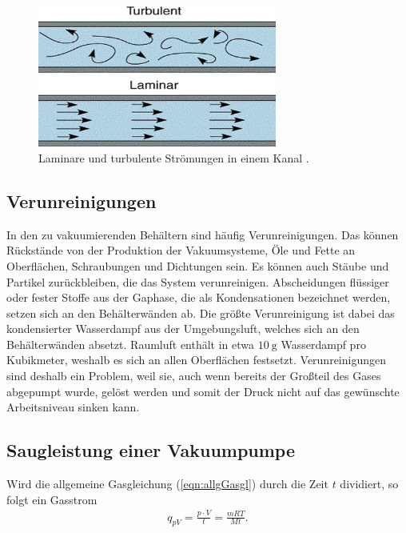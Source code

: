 \begin{figure}[H]
    \centering
    \includegraphics[width=0.7\textwidth]{data/LaminarTurbulent.jpeg}
    \caption{Laminare und turbulente Strömungen in einem Kanal \cite{LaminarTurbulent}.}
    \label{fig:lamiturbi}
\end{figure}

\subsection{Verunreinigungen}
\label{subsec:verunreinigungen}

In den zu vakuumierenden Behältern sind häufig Verunreinigungen. Das können Rückstände von der Produktion der Vakuumsysteme, Öle und Fette an Oberflächen, Schraubungen
und Dichtungen sein. Es können auch Stäube und Partikel zurückbleiben, die das System verunreinigen. Abscheidungen flüssiger oder fester Stoffe aus der Gaphase, die als Kondensationen
bezeichnet werden, setzen sich an den Behälterwänden ab. Die größte Verunreinigung ist dabei das kondensierter Wasserdampf aus der Umgebungsluft, welches sich an den Behälterwänden absetzt. 
Raumluft enthält in etwa $\SI{10}{\gram}$ Wasserdampf pro Kubikmeter, weshalb es sich an allen Oberflächen festsetzt. \newline
Verunreinigungen sind deshalb ein Problem, weil sie, auch wenn bereits der Großteil des Gases abgepumpt wurde, gelöst werden und somit der Druck nicht auf das gewünschte
Arbeitsniveau sinken kann.

\subsection{Saugleistung einer Vakuumpumpe}
\label{subsec:Saugleistung}

\noindent
Wird die allgemeine Gasgleichung (\ref{eqn:allgGasgl}) durch die Zeit $t$ dividiert, so folgt ein Gasstrom
\begin{align}
    q_{pV}=\frac{p\cdot V}{t} = \frac{mRT}{Mt}.
    \label{eqn:Gasstrom}
\end{align}

